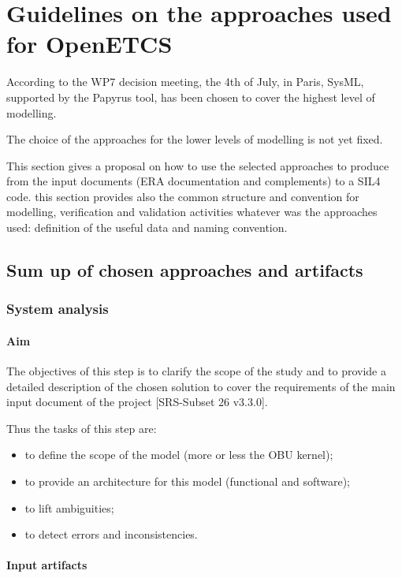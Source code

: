 
\section{Guidelines on the approaches used for OpenETCS}
\label{sec:guideline}


According to  the WP7 decision meeting, the 4th of July, in Paris, SysML, supported by the Papyrus tool,  has been chosen to  cover the highest level of modelling.

The choice of the approaches for the lower levels of modelling is not yet fixed.

This section gives a proposal on how to use the selected approaches to produce from the input documents (ERA documentation and complements)  to a SIL4 code. this section provides also the common structure and convention for modelling, verification and validation activities whatever was the approaches used: definition of the useful data and naming convention.

\subsection{Sum up of chosen approaches and artifacts}

\subsubsection{System analysis}

\paragraph{Aim}
The objectives of this step is to clarify the scope of the study and to provide a detailed description of the chosen solution to cover the requirements of the main input document of the project  [SRS-Subset 26 v3.3.0].

Thus the tasks of this step  are:
\begin{itemize}
\item to define the scope of the model (more or less the OBU kernel);
\item to provide an architecture for this model (functional and software);
\item to lift ambiguities;
\item to detect errors and inconsistencies.
\end{itemize}


\paragraph{Input artifacts}

